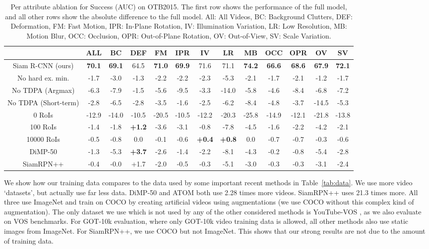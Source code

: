 \documentclass[10pt,twocolumn,letterpaper]{article}
\begin{document}
\begin{table*}[ht]
\centering
\footnotesize
\begin{tabular}{ccccccccccccc}
\toprule 
 & ALL & BC & DEF & FM & IPR & IV & LR & MB & OCC & OPR & OV & SV\tabularnewline
\midrule
Siam R-CNN (ours) & \textbf{70.1} & \textbf{69.1} & 64.5 & \textbf{71.0} & \textbf{69.9} & 71.6 & 71.1 & \textbf{74.2} & \textbf{66.6} & \textbf{68.6} & \textbf{67.9} & \textbf{72.1}\tabularnewline
\midrule
No hard ex. min. & -1.7 & -3.0 & -1.3 & -2.2 & -2.2 & -2.3 & -5.3 & -2.1 & -1.7 & -2.1 & -1.2 & -1.7\tabularnewline
No TDPA (Argmax) & -6.3 & -7.9 & -1.5 & -5.6 & -9.5 & -3.3 & -14.0 & -5.8 & -4.6 & -8.4 & -6.8 & -7.2 \tabularnewline
No TDPA (Short-term) & -2.8 & -6.5 & -2.8 & -3.5 & -1.6 & -2.5 & -6.2 & -8.4 & -4.8 & -3.7 & -14.5 & -5.3 \tabularnewline
0 RoIs & -12.9 & -14.0 & -10.5 & -20.5 & -10.5 & -12.2 & -20.3 & -25.8 & -14.9 & -12.1 & -21.8 & -13.8 \tabularnewline
100 RoIs & -1.4 & -1.8 & \textbf{+1.2} & -3.6 & -3.1 & -0.8 & -7.8 & -4.5 & -1.6 & -2.2 & -4.2 & -2.1\tabularnewline
10000 RoIs & -0.5 & -0.8 & 0.0 & -0.1 & -0.6 & \textbf{+0.4} & \textbf{+0.8} & 0.0 & -0.7 & -0.7 & -0.3 & -0.6\tabularnewline
\midrule 
DiMP-50 \cite{Bhat19ICCV} & -1.3 & -5.3 & \textbf{+3.7} & -2.6 & -1.4 & -2.2 & -8.1 & -4.3 & -0.2 & -0.8 & -5.4 & -2.8\tabularnewline
SiamRPN++ \cite{Li19CVPR} & -0.4 & -0.0 & +1.7 & -2.0 & -0.5 & -0.3 & -5.1 & -3.0 & -0.3 & -0.3 & -3.1 & -2.4\tabularnewline
\bottomrule
\end{tabular}
\caption{\label{tab:attr}Per attribute ablation for Success (AUC) on OTB2015. The first row shows the performance of the full model, and all other rows show the absolute difference to the full model. All: All Videos, BC: Background Clutters, DEF: Deformation, FM: Fast Motion, IPR: In-Plane Rotation, IV: Illumination Variation, LR: Low Resolution, MB: Motion Blur, OCC: Occlusion, OPR: Out-of-Plane Rotation, OV: Out-of-View, SV: Scale Variation.}
\end{table*}
We show how our training data compares to the data used by some important recent methods in Table~\ref{tab:data}. We use more video `datasets', but actually use far less data. DiMP-50 \cite{Bhat19ICCV} and ATOM \cite{Danelljan19CVPR} both use 2.28 times more videos. SiamRPN++ \cite{Li19CVPR} uses 21.3 times more. All three use ImageNet and train on COCO by creating artificial videos using augmentations (we use COCO without this complex kind of augmentation). The only dataset we use which is not used by any of the other considered methods is YouTube-VOS \cite{Xu18ECCV}, as we also evaluate on VOS benchmarks. For GOT-10k \cite{Huang18Arxiv} evaluation, where only GOT-10k video training data is allowed, all other methods also use static images from ImageNet. For SiamRPN++, we use COCO but not ImageNet. This shows that our strong results are not due to the amount of training data.
\end{document}
